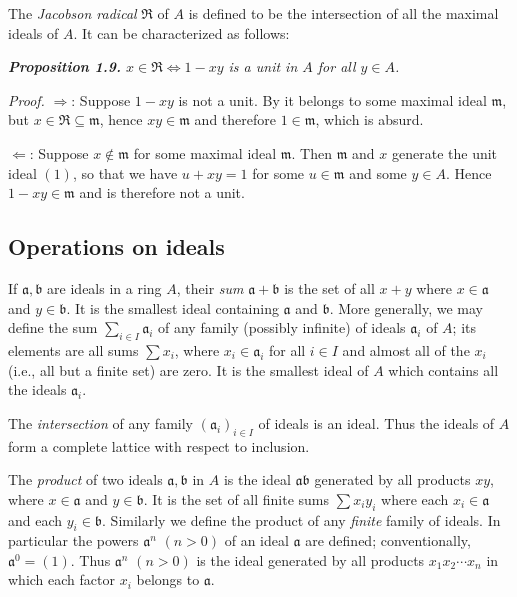 The \emph{Jacobson radical} $\mathfrak R$ of $A$ is defined to be the intersection of all the maximal ideals of $A$.  It can be characterized as follows:

\medskip
\noindent\textit{\textbf{Proposition 1.9.} $x\in\mathfrak R\Longleftrightarrow1-xy$ is a unit in $A$ for all $y\in A$.}

\noindent\emph{Proof.}  $\Rightarrow$: Suppose $1-xy$ is not a unit.  By  it belongs to some maximal
ideal $\mathfrak m$, but $x\in\mathfrak R\subseteq\mathfrak m$, hence $xy\in\mathfrak m$ and therefore $1\in\mathfrak m$, which is absurd.

$\Leftarrow$: Suppose $x\notin\mathfrak m$ for some maximal ideal $\mathfrak m$.  Then $\mathfrak m$ and $x$ generate the
unit ideal $(1)$, so that we have $u+xy=1$ for some $u\in\mathfrak m$ and some $y\in A$.
Hence $1-xy\in\mathfrak m$ and is therefore not a unit.\proofbox

\subsection{Operations on ideals}

If $\mathfrak a,\mathfrak b$ are ideals in a ring $A$, their \emph{sum} $\mathfrak a+\mathfrak b$ is the set of all $x+y$ where $x\in\mathfrak a$
and $y\in\mathfrak b$.  It is the smallest ideal containing $\mathfrak a$ and $\mathfrak b$.  More generally, we may
define the sum $\sum_{i\in I}\mathfrak a_i$ of any family (possibly infinite) of ideals $\mathfrak a_i$ of $A$; its elements are all sums $\sum x_i$, where $x_i\in\mathfrak a_i$ for all $i\in I$ and almost all of the $x_i$ (i.e.,
all but a finite set) are zero.  It is the smallest ideal of $A$ which contains all the
ideals $\mathfrak a_i$.

The \emph{intersection} of any family $(\mathfrak a_i)_{i\in I}$ of ideals is an ideal.  Thus the ideals of $A$
form a complete lattice with respect to inclusion.

The \emph{product} of two ideals $\mathfrak a,\mathfrak b$ in $A$ is the ideal $\mathfrak a\mathfrak b$ generated by all products $xy$,
where $x\in\mathfrak a$ and $y\in\mathfrak b$.  It is the set of all finite sums $\sum x_i y_i$ where each $x_i\in\mathfrak a$ and
each $y_i\in\mathfrak b$.  Similarly we define the product of any \emph{finite} family of ideals.  In
particular the powers $\mathfrak a^n$ $(n>0)$ of an ideal $\mathfrak a$ are defined; conventionally,
$\mathfrak a^0=(1)$.  Thus $\mathfrak a^n$ $(n>0)$ is the ideal generated by all products $x_1x_2\cdots x_n$
in which each factor $x_i$ belongs to $\mathfrak a$.

